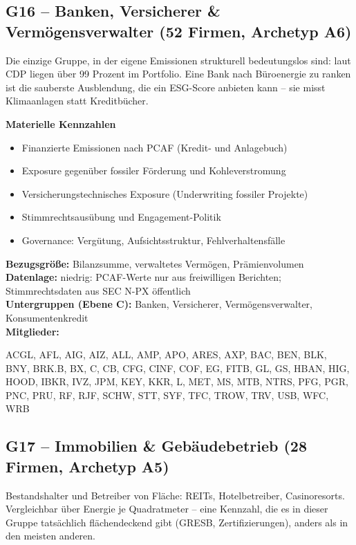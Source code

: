 \medskip
\subsection*{G16 -- Banken, Versicherer \& Vermögensverwalter \normalfont\small (52 Firmen, Archetyp A6)}
\noindent Die einzige Gruppe, in der eigene Emissionen strukturell bedeutungslos sind: laut CDP liegen über 99 Prozent im Portfolio. Eine Bank nach Büroenergie zu ranken ist die sauberste Ausblendung, die ein ESG-Score anbieten kann -- sie misst Klimaanlagen statt Kreditbücher.

\noindent\textbf{Materielle Kennzahlen}
\begin{itemize}[nosep,leftmargin=1.2em]
  \item Finanzierte Emissionen nach PCAF (Kredit- und Anlagebuch)
  \item Exposure gegenüber fossiler Förderung und Kohleverstromung
  \item Versicherungstechnisches Exposure (Underwriting fossiler Projekte)
  \item Stimmrechtsausübung und Engagement-Politik
  \item Governance: Vergütung, Aufsichtsstruktur, Fehlverhaltensfälle
\end{itemize}
\noindent\textbf{Bezugsgröße:} Bilanzsumme, verwaltetes Vermögen, Prämienvolumen\\
\textbf{Datenlage:} niedrig: PCAF-Werte nur aus freiwilligen Berichten; Stimmrechtsdaten aus SEC N-PX öffentlich\\
\textbf{Untergruppen (Ebene C):} Banken, Versicherer, Vermögensverwalter, Konsumentenkredit\\
\textbf{Mitglieder:} {\raggedright\small\ttfamily ACGL, AFL, AIG, AIZ, ALL, AMP, APO, ARES, AXP, BAC, BEN, BLK, BNY, BRK.B, BX, C, CB, CFG, CINF, COF, EG, FITB, GL, GS, HBAN, HIG, HOOD, IBKR, IVZ, JPM, KEY, KKR, L, MET, MS, MTB, NTRS, PFG, PGR, PNC, PRU, RF, RJF, SCHW, STT, SYF, TFC, TROW, TRV, USB, WFC, WRB\par}

\medskip
\subsection*{G17 -- Immobilien \& Gebäudebetrieb \normalfont\small (28 Firmen, Archetyp A5)}
\noindent Bestandshalter und Betreiber von Fläche: REITs, Hotelbetreiber, Casinoresorts. Vergleichbar über Energie je Quadratmeter -- eine Kennzahl, die es in dieser Gruppe tatsächlich flächendeckend gibt (GRESB, Zertifizierungen), anders als in den meisten anderen.

